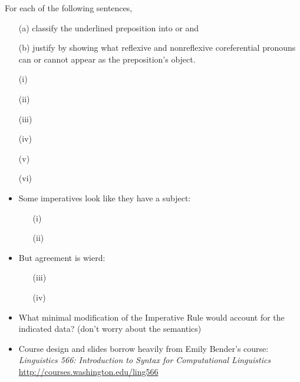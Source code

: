 \documentclass[a4paper,landscape,headrule,footrule]{foils}
\begin{document}

For each of the following sentences, 
\begin{itemize}
\item[(a)] classify the underlined preposition into 
  or  and
\item[(b)] justify by showing what reflexive and
  nonreflexive coreferential 
  pronouns can or cannot appear as the preposition's object.
\end{itemize}
\begin{itemize}\addtolength{\itemsep}{-1.5ex}
\item[(i)] 
\item[(ii)] 
\item[(iii)] 
\item[(iv)] 
\item[(v)] 
\item[(vi)] 
\end{itemize}

\begin{itemize}
\item Some imperatives look like they have a subject:
  \begin{itemize}
  \item[(i)] 
  \item[(ii)] 
  \end{itemize}
\item But agreement is wierd:
  \begin{itemize}
  \item[(iii)] 
  \item[(iv)]
  \end{itemize}
\item What minimal modification of the Imperative Rule would account for
the indicated data? (don't worry about
the semantics)
\end{itemize}




\begin{itemize}
\item Course design and slides borrow heavily from Emily Bender's course:
\textit{Linguistics 566: Introduction to Syntax for Computational Linguistics}
\\ \url{http://courses.washington.edu/ling566}
\end{itemize}


%
\end{document}
